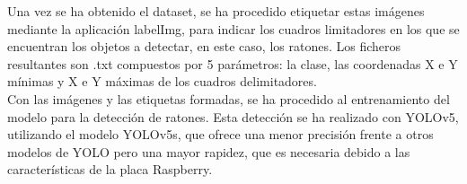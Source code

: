 Una vez se ha obtenido el dataset, se ha procedido etiquetar estas imágenes mediante la aplicación labelImg, para indicar los cuadros limitadores en los que se encuentran los objetos a detectar, en este caso, los ratones. Los ficheros resultantes son .txt compuestos por 5 parámetros: la clase, las coordenadas X e Y mínimas y X e Y máximas de los cuadros delimitadores.\\

Con las imágenes y las etiquetas formadas, se ha procedido al entrenamiento del modelo para la detección de ratones. Esta detección se ha realizado con YOLOv5, utilizando el modelo YOLOv5s, que ofrece una menor precisión frente a otros modelos de YOLO pero una mayor rapidez, que es necesaria debido a las características de la placa Raspberry.\\

